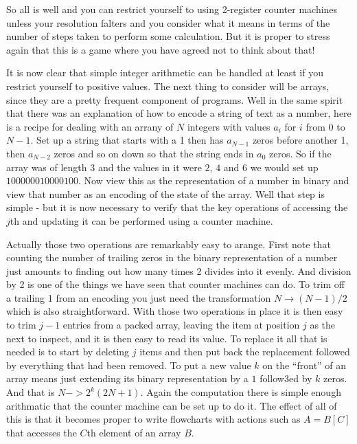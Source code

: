 So all is well and you can restrict yourself to using 2-register
counter machines unless your resolution falters and you consider what it
means in terms of the number of steps taken to perform some calculation.
But it is proper to stress again that this is a game where you have agreed
not to think about that!

It is now clear that simple integer arithmetic can be handled at least
if you restrict yourself to positive values. The next thing to
consider will be arrays, since they are a pretty frequent component of
programs. Well in the same spirit that there was an explanation of how
to encode a string of text as a number, here is a recipe for dealing
with an arrany of $N$ integers with values $a_i$ for $i$ from $0$ to
$N-1$. Set up a string that starts with a 1 then has $a_{N-1}$ zeros before
another 1, then $a_{N-2}$ zeros and so on down so that the string ends
in $a_0$ zeros. So if the array was of length 3 and the values in it
were $2$, $4$ and $6$ we would set up $100000010000100$. Now view this
as the representation of a number in binary and view that number as an
encoding of the state of the array. Well that step is simple - but it is
now necessary to verify that the key operations of accessing the $j$th
and updating it can be performed using a counter machine.

Actually those two operations are remarkably easy to arange. First
note that counting the number of trailing zeros in the binary representation
of a number just amounts to finding out how many times 2 divides into it
evenly. And division by 2 is one of the things we have seen that counter
machines can do. To trim off a trailing 1 from an encoding you just need
the transformation $N \rightarrow (N-1)/2$ which is also straightforward.
With those two operations in place it is then easy to trim $j-1$ entries from
a packed array, leaving the item at position $j$ as the next to inspect,
and it is then easy to read its value. To replace it all that is needed
is to start by deleting $j$ items and then put back the replacement
followed by everything that had been removed. To put a new value $k$ on
the ``front'' of an array means just extending its binary representation by
a $1$ follow3ed by $k$ zeros. And that is $N -> 2^{k}(2N+1)$. Again the
computation there is simple enough arithmatic that the counter machine can
be set up to do it. The effect of all of this is that it becomes
proper to write flowcharts with actions such as $A = B[C]$ that
accesses the $C$th element of an array $B$.

